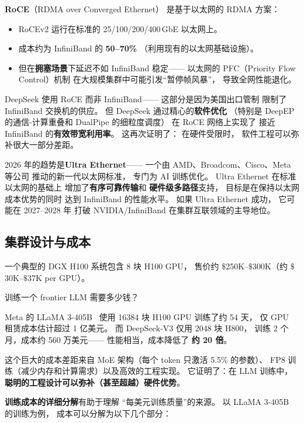 \textbf{RoCE}（RDMA over Converged Ethernet）
是基于以太网的 RDMA 方案：
\begin{itemize}[noitemsep]
  \item RoCEv2 运行在标准的 25/100/200/400\,GbE 以太网上。
  \item 成本约为 InfiniBand 的 \textbf{50--70\%}
        （利用现有的以太网基础设施）。
  \item 但在\textbf{拥塞场景}下延迟不如 InfiniBand 稳定——
        以太网的 PFC（Priority Flow Control）机制
        在大规模集群中可能引发``暂停帧风暴''，
        导致全网性能退化。
\end{itemize}

DeepSeek 使用 RoCE 而非 InfiniBand——
这部分是因为美国出口管制
限制了 InfiniBand 交换机的供应。
但 DeepSeek 通过精心的\textbf{软件优化}
（特别是 DeepEP 的通信-计算重叠和
DualPipe 的细粒度调度）
在 RoCE 网络上实现了
接近 InfiniBand 的\textbf{有效带宽利用率}。
这再次证明了：
在硬件受限时，
软件工程可以弥补很大一部分差距。

2026 年的趋势是\textbf{Ultra Ethernet}——
一个由 AMD、Broadcom、Cisco、Meta 等公司
推动的新一代以太网标准，
专门为 AI 训练优化。
Ultra Ethernet 在标准以太网的基础上
增加了\textbf{有序可靠传输}和
\textbf{硬件级多路径}支持，
目标是在保持以太网成本优势的同时
达到 InfiniBand 的性能水平。
如果 Ultra Ethernet 成功，
它可能在 2027--2028 年
打破 NVIDIA/InfiniBand 在集群互联领域的主导地位。

\subsection{集群设计与成本}

一个典型的 DGX H100 系统包含 8 块 H100 GPU，
售价约 $\$$250K--$\$$300K（约 $\$$30K--$\$$37K per GPU）。

训练一个 frontier LLM 需要多少钱？

Meta 的 LLaMA 3-405B~\cite{dubey2024llama3}
使用 16384 块 H100 GPU 训练了约 54 天，
仅 GPU 租赁成本估计超过 1 亿美元。
而 DeepSeek-V3 仅用 2048 块 H800，
训练 2 个月，成本约 560 万美元——
性能相当，成本降低了 \textbf{约 20 倍}。

这个巨大的成本差距来自 MoE 架构（每个 token 只激活 5.5\% 的参数）、
FP8 训练（减少内存和计算需求）以及高效的工程实现。
它证明了：在 LLM 训练中，
\textbf{聪明的工程设计可以弥补（甚至超越）硬件优势}。

\textbf{训练成本的详细分解}有助于理解
``每美元训练质量''的来源。
以 LLaMA 3-405B 的训练为例，
成本可以分解为以下几个部分：

